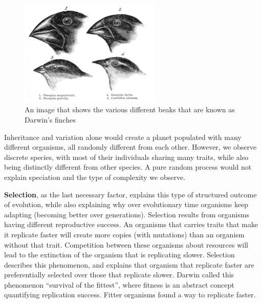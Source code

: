 \documentclass[12pt,oneside,listof=totoc,paper=a4,headings=small]{scrbook}
\begin{document}
\begin{figure}[h!]
\centering
\includegraphics[width=0.6\textwidth,height=0.6\textheight,keepaspectratio]{images/variation_Darwin's_finches_by_Gould.jpg}
\caption{An image that shows the various different beaks that are known as Darwin's finches~\cite{DarwinsFinches}}
\label{fig:darwinsfinches}
\end{figure}

Inheritance and variation alone would create a planet populated with many different organisms, all randomly different from each other. However, we observe discrete species, with most of their individuals sharing many traits, while also being distinctly different from other species. A pure random process would not explain speciation and the type of complexity we observe.

\newpage
\textbf{Selection}, as the last necessary factor, explains this type of structured outcome of evolution, while also explaining why over evolutionary time organisms keep adapting (becoming better over generations). Selection results from organisms having different reproductive success. An organisms that carries traits that make it replicate faster will create more copies (with mutations) than an organism without that trait. Competition between these organisms about resources will lead to the extinction of the organism that is replicating slower. Selection describes this phenomenon, and explains that organism that replicate faster are preferentially selected over those that replicate slower. Darwin called this phenomenon ``survival of the fittest'', where fitness is an abstract concept quantifying replication success. Fitter organisms found a way to replicate faster.
\end{document}
